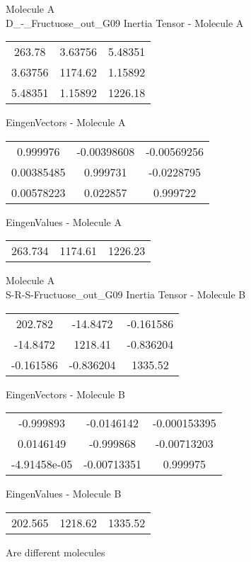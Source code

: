 \newpage
\begin{multicols}{2}
\begin{center}
Molecule A \\ 
D_-_Fructuose_out_G09
Inertia Tensor - Molecule A \\
\vtab
\begin{tabular}{|c c c|}
263.78	 & 	3.63756	 & 	5.48351	 \\
3.63756	 & 	1174.62	 & 	1.15892	 \\
5.48351	 & 	1.15892	 & 	1226.18
\end{tabular}

\vtab
 EingenVectors - Molecule A     \\
\vtab
\begin{tabular}{|c c c|}
0.999976	 & 	-0.00398608	 & 	-0.00569256	 \\
0.00385485	 & 	0.999731	 & 	-0.0228795	 \\
0.00578223	 & 	0.022857	 & 	0.999722
\end{tabular}

\vtab
 EingenValues - Molecule A     \\
\vtab
\begin{tabular}{|c c c|}
263.734	 & 	1174.61	 & 	1226.23
\end{tabular}
\columnbreak
Molecule A \\ 
S-R-S-Fructuose_out_G09
Inertia Tensor - Molecule B \\
\vtab
\begin{tabular}{|c c c|}
202.782	 & 	-14.8472	 & 	-0.161586	 \\
-14.8472	 & 	1218.41	 & 	-0.836204	 \\
-0.161586	 & 	-0.836204	 & 	1335.52
\end{tabular}

\vtab
 EingenVectors - Molecule B     \\
\vtab
\begin{tabular}{|c c c|}
-0.999893	 & 	-0.0146142	 & 	-0.000153395	 \\
0.0146149	 & 	-0.999868	 & 	-0.00713203	 \\
-4.91458e-05	 & 	-0.00713351	 & 	0.999975
\end{tabular}

\vtab
 EingenValues - Molecule B     \\
\vtab
\begin{tabular}{|c c c|}
202.565	 & 	1218.62	 & 	1335.52
\end{tabular}
\textcolor{NavyBlue}{\large Are different molecules}
\end{center}
\end{multicols}
